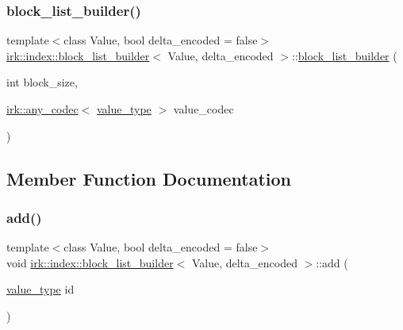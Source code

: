 \subsubsection{\texorpdfstring{block\+\_\+list\+\_\+builder()}{block\_list\_builder()}}
{\footnotesize\ttfamily template$<$class Value, bool delta\+\_\+encoded = false$>$ \\
\mbox{\hyperlink{classirk_1_1index_1_1block__list__builder}{irk\+::index\+::block\+\_\+list\+\_\+builder}}$<$ Value, delta\+\_\+encoded $>$\+::\mbox{\hyperlink{classirk_1_1index_1_1block__list__builder}{block\+\_\+list\+\_\+builder}} (\begin{DoxyParamCaption}\item[{int}]{block\+\_\+size,  }\item[{\mbox{\hyperlink{namespaceirk_a831a3a869cf19601dbfb5c41765a2e87}{irk\+::any\+\_\+codec}}$<$ \mbox{\hyperlink{classirk_1_1index_1_1block__list__builder_a719a9c8b64ca17f48969aa811b2a5b1d}{value\+\_\+type}} $>$}]{value\+\_\+codec }\end{DoxyParamCaption})\hspace{0.3cm}{\ttfamily [inline]}}



\subsection{Member Function Documentation}
\mbox{\label{classirk_1_1index_1_1block__list__builder_a59c0f1b2578902b115d23060b60b13c8}} 
\subsubsection{\texorpdfstring{add()}{add()}}
{\footnotesize\ttfamily template$<$class Value, bool delta\+\_\+encoded = false$>$ \\
void \mbox{\hyperlink{classirk_1_1index_1_1block__list__builder}{irk\+::index\+::block\+\_\+list\+\_\+builder}}$<$ Value, delta\+\_\+encoded $>$\+::add (\begin{DoxyParamCaption}\item[{\mbox{\hyperlink{classirk_1_1index_1_1block__list__builder_a719a9c8b64ca17f48969aa811b2a5b1d}{value\+\_\+type}}}]{id }\end{DoxyParamCaption})\hspace{0.3cm}{\ttfamily [inline]}}

